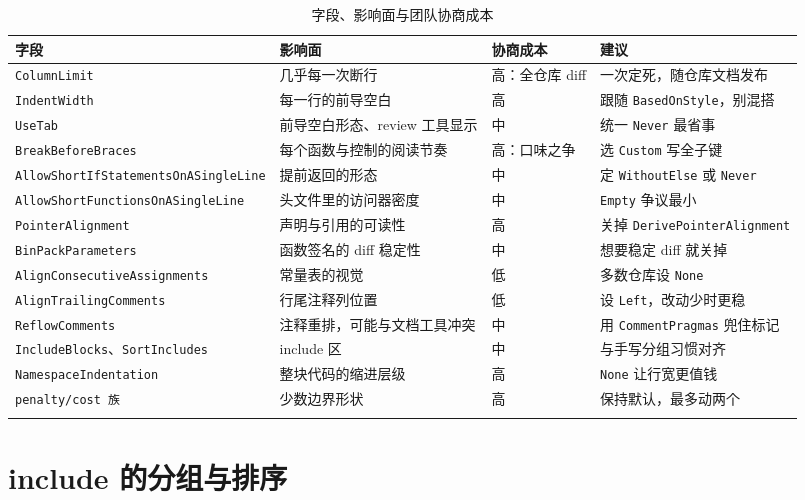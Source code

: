\documentclass[12pt,a4paper,fontset=fandol]{ctexbook}
\begin{document}
{\footnotesize
\begin{longtable}{%
  >{\raggedright\arraybackslash}p{}%
  >{\raggedright\arraybackslash}p{}%
  >{\raggedright\arraybackslash}p{}%
  >{\raggedright\arraybackslash}p{}%
  }
  \toprule
  字段 & 影响面 & 协商成本 & 建议 \\
  \midrule
  \endhead
  \texttt{ColumnLimit} & 几乎每一次断行 & 高：全仓库 diff & 一次定死，随仓库文档发布 \\
  \texttt{IndentWidth} & 每一行的前导空白 & 高 & 跟随 \texttt{BasedOnStyle}，别混搭 \\
  \texttt{UseTab} & 前导空白形态、review 工具显示 & 中 & 统一 \texttt{Never} 最省事 \\
  \texttt{BreakBeforeBraces} & 每个函数与控制的阅读节奏 & 高：口味之争 & 选 \texttt{Custom} 写全子键 \\
  \texttt{Allow\-Short\-If\-State\-ments\-On\-ASingleLine} & 提前返回的形态 & 中 & 定 \texttt{WithoutElse} 或 \texttt{Never} \\
  \texttt{AllowShortFunctions\-OnASingleLine} & 头文件里的访问器密度 & 中 & \texttt{Empty} 争议最小 \\
  \texttt{PointerAlignment} & 声明与引用的可读性 & 高 & 关掉 \texttt{DerivePointer\-Alignment} \\
  \texttt{BinPackParameters} & 函数签名的 diff 稳定性 & 中 & 想要稳定 diff 就关掉 \\
  \texttt{Align\-Consecutive\-Assignments} & 常量表的视觉 & 低 & 多数仓库设 \texttt{None} \\
  \texttt{AlignTrailingComments} & 行尾注释列位置 & 低 & 设 \texttt{Left}，改动少时更稳 \\
  \texttt{ReflowComments} & 注释重排，可能与文档工具冲突 & 中 & 用 \texttt{CommentPragmas} 兜住标记 \\
  \texttt{IncludeBlocks}、\texttt{SortIncludes} & include 区 & 中 & 与手写分组习惯对齐 \\
  \texttt{NamespaceIndentation} & 整块代码的缩进层级 & 高 & \texttt{None} 让行宽更值钱 \\
  \texttt{penalty/cost 族} & 少数边界形状 & 高 & 保持默认，最多动两个 \\
  \bottomrule
  \caption{字段、影响面与团队协商成本}
  \label{tab:ch09-fields}
\end{longtable}
}

\section{include 的分组与排序}\label{sec:ch09-s5}
\end{document}
